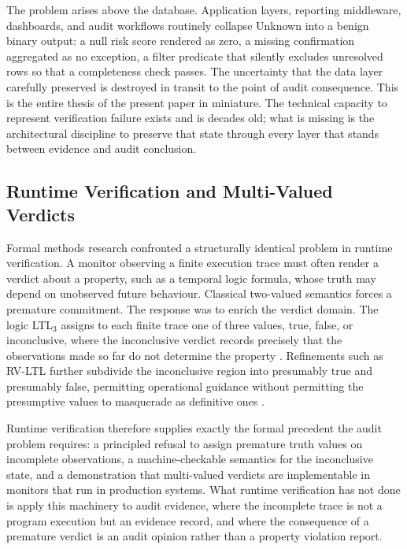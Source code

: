 \documentclass[11pt,a4paper]{article}
\theoremstyle{definition}
\theoremstyle{remark}
\begin{document}
The problem arises above the database. Application layers, reporting middleware, dashboards, and audit workflows routinely collapse \textsf{Unknown} into a benign binary output: a null risk score rendered as zero, a missing confirmation aggregated as no exception, a filter predicate that silently excludes unresolved rows so that a completeness check passes. The uncertainty that the data layer carefully preserved is destroyed in transit to the point of audit consequence. This is the entire thesis of the present paper in miniature. The technical capacity to represent verification failure exists and is decades old; what is missing is the architectural discipline to preserve that state through every layer that stands between evidence and audit conclusion.

\subsection{Runtime Verification and Multi-Valued Verdicts}
\label{sec:lit-rv}

Formal methods research confronted a structurally identical problem in runtime verification. A monitor observing a finite execution trace must often render a verdict about a property, such as a temporal logic formula, whose truth may depend on unobserved future behaviour. Classical two-valued semantics forces a premature commitment. The response was to enrich the verdict domain. The logic LTL$_3$ assigns to each finite trace one of three values, true, false, or inconclusive, where the inconclusive verdict records precisely that the observations made so far do not determine the property \citep{bauer2011}. Refinements such as RV-LTL further subdivide the inconclusive region into presumably true and presumably false, permitting operational guidance without permitting the presumptive values to masquerade as definitive ones \citep{bauer2010, leucker2009}.

Runtime verification therefore supplies exactly the formal precedent the audit problem requires: a principled refusal to assign premature truth values on incomplete observations, a machine-checkable semantics for the inconclusive state, and a demonstration that multi-valued verdicts are implementable in monitors that run in production systems. What runtime verification has not done is apply this machinery to audit evidence, where the incomplete trace is not a program execution but an evidence record, and where the consequence of a premature verdict is an audit opinion rather than a property violation report.
\end{document}
